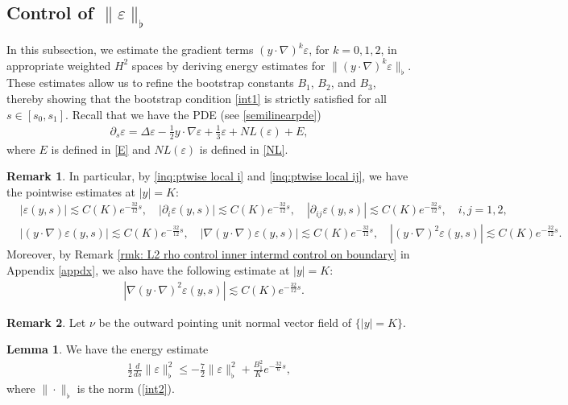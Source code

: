 \documentclass[11pt,reqno]{amsart}
\theoremstyle{definition}
\theoremstyle{bfremark}
\newtheorem{remark}{Remark}[section]
\newtheorem{lemma}{Lemma}[section]
\numberwithin{equation}{section}
\begin{document}
\subsection{Control of \(\|\varepsilon\|_{\flat}\)}
\label{subsection5.2}
In this subsection, we estimate the gradient terms \((y \cdot \nabla)^k \varepsilon\), for \(k = 0, 1, 2\), in appropriate weighted \(H^2\) spaces by deriving energy estimates for \(\|(y \cdot \nabla)^k \varepsilon\|_{\flat}\). These estimates allow us to refine the bootstrap constants \(B_1\), \(B_2\), and \(B_3\), thereby showing that the bootstrap condition \ref{int1} is strictly satisfied for all \(s \in [s_0, s_1]\). Recall that we have the PDE (see \ref{semilinearpde})
\begin{align}
    \partial_s \varepsilon=\Delta \varepsilon-\frac{1}{2}y \cdot \nabla \varepsilon+\frac{1}{3}\varepsilon+NL(\varepsilon)+E,
\end{align}
where \(E\) is defined in \ref{E} and \(NL(\varepsilon)\) is defined in \ref{NL}.
\begin{remark}
\label{inq:bdd term estimate}
In particular, by \ref{inq:ptwise local i} and \ref{inq:ptwise local ij}, we have the pointwise estimates at \(|y|=K\):
\begin{align*}
& |\varepsilon(y,s)|\lesssim C(K)e^{-\frac{32}{12}s}, \quad |\partial_i\varepsilon(y,s)| \lesssim C(K)e^{-\frac{32}{12}s}, \quad
|\partial_{ij}\varepsilon(y,s)| \lesssim C(K)e^{-\frac{32}{12}s},\quad i,j=1,2,\\
&|(y \cdot \nabla)\varepsilon(y,s)| \lesssim C(K)e^{-\frac{32}{12}s},\quad |\nabla(y \cdot \nabla)\varepsilon(y,s)| \lesssim C(K)e^{-\frac{32}{12}s},\quad |(y \cdot \nabla)^2 \varepsilon(y,s)| \lesssim C(K)e^{-\frac{32}{12}s}.
\end{align*}
Moreover, by Remark \ref{rmk: L2 rho control inner intermd control on boundary} in Appendix \ref{appdx}, we also have the following estimate at \(|y|=K\):
\begin{align}
    &|\nabla(y \cdot \nabla)^2 \varepsilon(y,s)| \lesssim C(K)e^{-\frac{32}{12}s}.\label{inq:K pt nabla(y nabla)^2 veph}
\end{align}
\end{remark}
\begin{remark}
    Let \(\nu\) be the outward pointing unit normal vector field of \(\{|y|=K\}\).
\end{remark}
   
\begin{lemma}
\label{Lemma5.5}
    We have the energy estimate
    \begin{align}
        \frac{1}{2}\frac{d}{ds}\|\varepsilon\|_{\flat}^2 \leq-\frac{7}{2}\|\varepsilon\|^2_{\flat}+\frac{B_1^2}{K} e^{-\frac{32}{6}s},\label{en3}
    \end{align}
   where \(\|\cdot\|_{\flat}\) is the norm (\ref{int2}).
\end{lemma}
\end{document}
